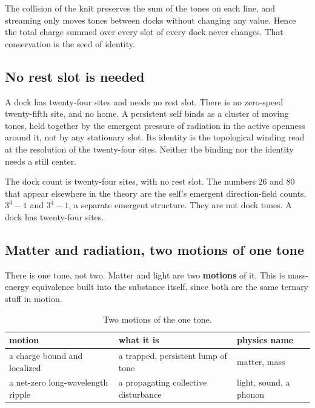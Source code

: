 \begin{proposition}
The collision of the knit preserves the sum of the tones on each line, and streaming only moves tones between docks without changing any value. Hence the total charge summed over every slot of every dock never changes. That conservation is the seed of identity.
\end{proposition}

\subsection{No rest slot is needed}

A dock has twenty-four sites and needs no rest slot. There is no zero-speed twenty-fifth site, and no home. A persistent self binds as a cluster of moving tones, held together by the emergent pressure of radiation in the active openness around it, not by any stationary slot. Its identity is the topological winding read at the resolution of the twenty-four sites. Neither the binding nor the identity needs a still center.

\begin{result}
The dock count is twenty-four sites, with no rest slot. The numbers $26$ and $80$ that appear elsewhere in the theory are the self's emergent direction-field counts, $3^3 - 1$ and $3^4 - 1$, a separate emergent structure. They are not dock tones. A dock has twenty-four sites.
\end{result}

\subsection{Matter and radiation, two motions of one tone}

There is one tone, not two. Matter and light are two \textbf{motions} of it. This is mass-energy equivalence built into the substance itself, since both are the same ternary stuff in motion.

\begin{table}[ht]
\centering
\begin{tabular}{@{}lll@{}}
\toprule
motion & what it is & physics name \\
\midrule
a charge bound and localized & a trapped, persistent lump of tone & matter, mass \\
a net-zero long-wavelength ripple & a propagating collective disturbance & light, sound, a phonon \\
\bottomrule
\end{tabular}
\caption{Two motions of the one tone.}
\label{tab:matter-radiation}
\end{table}

